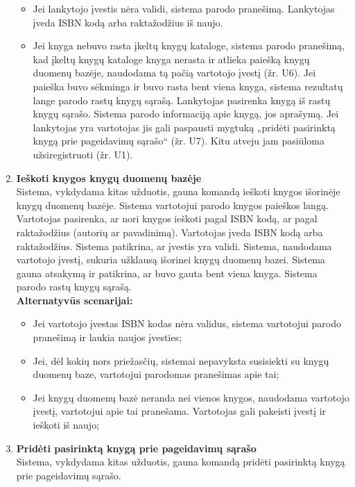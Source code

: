 \documentclass{VUMIFPSkursinis}
\begin{document}
\begin{enumerate}[label=\textbf{U\arabic*.}]
				\begin{itemize}
					\item Jei lankytojo įvestis nėra validi, sistema parodo pranešimą. Lankytojas įveda ISBN kodą arba raktažodžius iš naujo.
					\item Jei knyga nebuvo rasta įkeltų knygų kataloge, sistema parodo pranešimą, kad įkeltų knygų kataloge knyga nerasta 
						ir atlieka paiešką knygų duomenų bazėje, naudodama tą pačią vartotojo įvestį (žr. U6). Jei paieška buvo sėkminga ir buvo rasta bent viena knyga, 
						sistema rezultatų lange parodo rastų knygų sąrašą. Lankytojas pasirenka knygą iš rastų knygų sąrašo.
						Sistema parodo informaciją apie knygą, jos aprašymą. Jei lankytojas yra vartotojas jis gali paspausti mygtuką „pridėti pasirinktą knygą prie pageidavimų sąrašo“ (žr. U7).
						Kitu atveju jam pasiūloma užsiregistruoti (žr. U1).
				\end{itemize}
			\item \textbf{Ieškoti knygos knygų duomenų bazėje}\\
				Sistema, vykdydama kitas užduotis, gauna komandą ieškoti knygos išorinėje knygų duomenų bazėje. 
				Sistema vartotojui parodo knygos paieškos langą. Vartotojas pasirenka, ar nori knygos ieškoti pagal
				ISBN kodą, ar pagal raktažodžius (autorių ar pavadinimą). Vartotojas įveda ISBN kodą arba raktažodžius.
				Sistema patikrina, ar įvestis yra validi. Sistema, naudodama vartotojo įvestį, sukuria užklausą išorinei knygų duomenų bazei. 
				Sistema gauna atsakymą ir patikrina, ar buvo gauta bent viena knyga. Sistema parodo rastų knygų sąrašą.\\
				\textbf{Alternatyvūs scenarijai:}
				\begin{itemize}
					\item Jei vartotojo įvestas ISBN kodas nėra validus, sistema vartotojui parodo pranešimą ir laukia naujos įvesties;
					\item Jei, dėl kokių nors priežasčių, sistemai nepavyksta susisiekti su knygų duomenų baze, vartotojui parodomas pranešimas apie tai;
					\item Jei knygų duomenų bazė neranda nei vienos knygos, naudodama vartotojo įvestį, vartotojui apie tai pranešama. 
						Vartotojas gali pakeisti įvestį ir ieškoti iš naujo;
				\end{itemize}
			\item \textbf{Pridėti pasirinktą knygą prie pageidavimų sąrašo}\\
				Sistema, vykdydama kitas užduotis, gauna komandą pridėti pasirinktą knygą prie pageidavimų sąrašo.

\end{enumerate}
\end{document}
